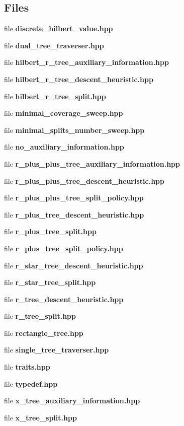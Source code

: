 \subsection*{Files}
\begin{DoxyCompactItemize}
\item 
file {\bf discrete\+\_\+hilbert\+\_\+value.\+hpp}
\item 
file {\bf dual\+\_\+tree\+\_\+traverser.\+hpp}
\item 
file {\bf hilbert\+\_\+r\+\_\+tree\+\_\+auxiliary\+\_\+information.\+hpp}
\item 
file {\bf hilbert\+\_\+r\+\_\+tree\+\_\+descent\+\_\+heuristic.\+hpp}
\item 
file {\bf hilbert\+\_\+r\+\_\+tree\+\_\+split.\+hpp}
\item 
file {\bf minimal\+\_\+coverage\+\_\+sweep.\+hpp}
\item 
file {\bf minimal\+\_\+splits\+\_\+number\+\_\+sweep.\+hpp}
\item 
file {\bf no\+\_\+auxiliary\+\_\+information.\+hpp}
\item 
file {\bf r\+\_\+plus\+\_\+plus\+\_\+tree\+\_\+auxiliary\+\_\+information.\+hpp}
\item 
file {\bf r\+\_\+plus\+\_\+plus\+\_\+tree\+\_\+descent\+\_\+heuristic.\+hpp}
\item 
file {\bf r\+\_\+plus\+\_\+plus\+\_\+tree\+\_\+split\+\_\+policy.\+hpp}
\item 
file {\bf r\+\_\+plus\+\_\+tree\+\_\+descent\+\_\+heuristic.\+hpp}
\item 
file {\bf r\+\_\+plus\+\_\+tree\+\_\+split.\+hpp}
\item 
file {\bf r\+\_\+plus\+\_\+tree\+\_\+split\+\_\+policy.\+hpp}
\item 
file {\bf r\+\_\+star\+\_\+tree\+\_\+descent\+\_\+heuristic.\+hpp}
\item 
file {\bf r\+\_\+star\+\_\+tree\+\_\+split.\+hpp}
\item 
file {\bf r\+\_\+tree\+\_\+descent\+\_\+heuristic.\+hpp}
\item 
file {\bf r\+\_\+tree\+\_\+split.\+hpp}
\item 
file {\bf rectangle\+\_\+tree.\+hpp}
\item 
file {\bf single\+\_\+tree\+\_\+traverser.\+hpp}
\item 
file {\bf traits.\+hpp}
\item 
file {\bf typedef.\+hpp}
\item 
file {\bf x\+\_\+tree\+\_\+auxiliary\+\_\+information.\+hpp}
\item 
file {\bf x\+\_\+tree\+\_\+split.\+hpp}
\end{DoxyCompactItemize}
